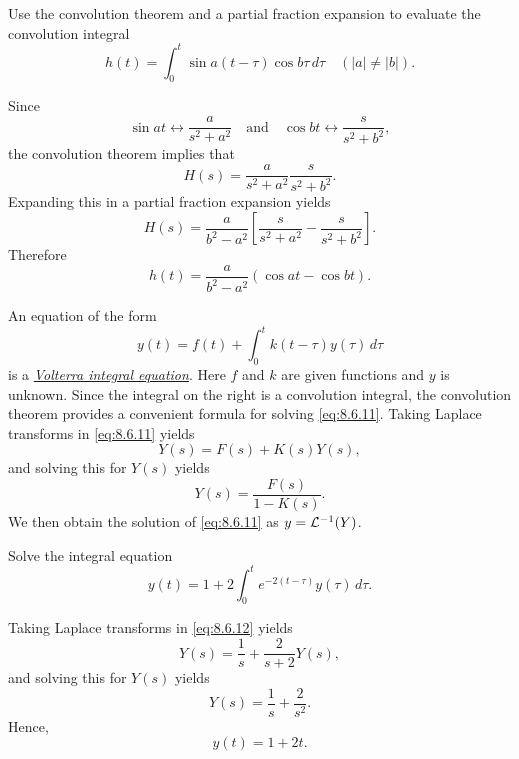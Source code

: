 \begin{example}
  \label{example:8.6.6}\rm Use the convolution theorem and a partial fraction expansion to evaluate
  the convolution integral
  \[
    h(t)=\int_{0}^{t}\sin a(t-\tau)\cos b\tau\,d\tau\quad(|a|\ne|b|).
  \]
\end{example}

\begin{examplesolution}
\solution Since
\[
  \sin at\leftrightarrow\frac{a}{s^{2}+a^{2}}\quad\mbox{and}\quad \cos bt\leftrightarrow\frac{s}{s^{2}+b^{2}},
\]
the convolution theorem implies that
\[
  H(s)=\frac{a}{s^{2}+a^{2}}\frac{s}{s^{2}+b^{2}}.
\]
Expanding this in a partial fraction expansion yields
\[
  H(s)=\frac{a}{b^{2}-a^{2}}\left[\frac{s}{s^{2}+a^{2}}-\frac{s}{s^{2}+b^{2}}\right].
\]
Therefore
\[
  h(t)=\frac{a}{b^{2}-a^{2}}\left(\cos at-\cos bt\right).
\]
\end{examplesolution}


\noindent
An equation of the form
\begin{equation}
  \label{eq:8.6.11}y(t)=f(t)+\int_{0}^{t}k(t-\tau)y(\tau)\,d\tau
\end{equation}
is a
\href{https://mathshistory.st-andrews.ac.uk/Biographies/Volterra/}{\color{blue}
\it Volterra integral equation}. Here $f$ and $k$ are given functions and $y$ is unknown. Since the
integral on the right is a convolution integral, the convolution theorem provides a convenient
formula for solving \eqref{eq:8.6.11}. Taking Laplace transforms in \eqref{eq:8.6.11} yields
\[
  Y(s)=F(s)+K(s)Y(s),
\]
and solving this for $Y(s)$ yields
\[
  Y(s)=\frac{F(s)}{1-K(s)}.
\]
We then obtain the solution of \eqref{eq:8.6.11} as $y={\cal L}^{-1}(Y)$.

\begin{example}
  \label{example:8.6.7}\rm Solve the integral equation
  \begin{equation}
    \label{eq:8.6.12}y(t)=1+2\int_{0}^{t}e^{-2(t-\tau)}y(\tau)\,d\tau.
  \end{equation}
\end{example}

\begin{examplesolution}
\solution Taking Laplace transforms in \eqref{eq:8.6.12} yields
\[
  Y(s)=\frac{1}{s}+\frac{2}{s+2}Y(s),
\]
and solving this for $Y(s)$ yields
\[
  Y(s)=\frac{1}{s}+\frac{2}{s^{2}}.
\]
Hence,
\[
  y(t)=1+2t.
\]
\end{examplesolution}

